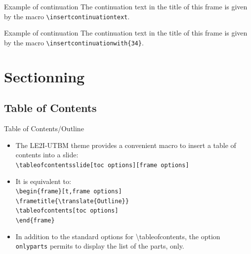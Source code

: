 \documentclass[english,sectioncirclenumberstyle]{le2iutbmbeamer}
\begin{document}
\begin{frame}{Example of continuation \insertcontinuationtext}
	The continuation text in the title of this frame is given by the macro \texttt{{\textbackslash}insertcontinuationtext}.
\end{frame}

\begin{frame}{Example of continuation}
	The continuation text in the title of this frame is given by the macro \texttt{{\textbackslash}insertcontinuationwith\{34\}}.
\end{frame}

\section{Sectionning}
\tableofcontentslide[sectionstyle={show/shaded},subsectionstyle={show/show/hide},subsubsectionstyle={hide/hide/hide/hide},sections={1-6}]

\subsection{Table of Contents}

\begin{frame}{Table of Contents/Outline}
	\begin{itemize}
	\item The LE2I-UTBM theme provides a convenient macro to insert a table of contents into a slide: \\
		\texttt{{\textbackslash}tableofcontentsslide[toc options][frame options]}
	\vspace{1em}
	\item It is equivalent to: \\
		\texttt{{\textbackslash}begin\{frame\}[t,frame options]} \\
		\texttt{{\textbackslash}frametitle\{{\textbackslash}translate\{Outline\}\}} \\
		\texttt{{\textbackslash}tableofcontents[toc options]} \\
		\texttt{{\textbackslash}end\{frame\}}
	\vspace{1em}
	\item In addition to the standard options for {{\textbackslash}tableofcontents}, the option \texttt{onlyparts} permits to display the list of the parts, only.
	\end{itemize}
\end{frame}
\end{document}
